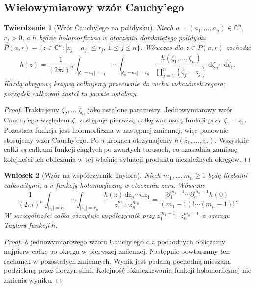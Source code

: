 \documentclass[11pt,a4paper,openany]{report}
\numberwithin{equation}{section}
\theoremstyle{plain}
\newtheorem{twierdzenie}{Twierdzenie}[section]
\newtheorem{wniosek}[twierdzenie]{Wniosek}
\theoremstyle{definition}
\theoremstyle{remark}
\newcommand{\C}{\mathbb C}
\begin{document}
\subsection{Wielowymiarowy wzór Cauchy'ego}
\label{subsec:ga4-cauchy-product}

\begin{twierdzenie}[Wzór Cauchy'ego na polidysku]
\label{tw:ga4-polydisc-cauchy}
Niech $a=(a_1,\ldots,a_n)\in\C^n$, $r_j>0$, a $h$ będzie
holomorficzna w otoczeniu domkniętego polidysku
$\overline P(a,r)=\{z\in\C^n:|z_j-a_j|\le r_j,\ 1\le j\le n\}$.
Wówczas dla $z\in P(a,r)$ zachodzi
\[
 h(z)=\frac{1}{(2\pi i)^n}
 \int_{|\zeta_1-a_1|=r_1}\!\cdots
 \int_{|\zeta_n-a_n|=r_n}
 \frac{h(\zeta_1,\ldots,\zeta_n)}
 {\prod_{j=1}^n(\zeta_j-z_j)}
 \,\mathrm d\zeta_n\cdots\mathrm d\zeta_1.
\]
Każdą okręgową krzywą całkujemy przeciwnie do ruchu wskazówek
zegara; porządek całkowań został tu jawnie ustalony.
\end{twierdzenie}
\begin{proof}
Traktujemy $\zeta_2,\ldots,\zeta_n$ jako ustalone parametry.
Jednowymiarowy wzór Cauchy'ego względem $\zeta_1$ zastępuje
pierwszą całkę wartością funkcji przy $\zeta_1=z_1$.
Pozostała funkcja jest holomorficzna w następnej zmiennej,
więc ponownie stosujemy wzór Cauchy'ego. Po $n$ krokach
otrzymujemy $h(z_1,\ldots,z_n)$.
Wszystkie całki są całkami funkcji ciągłych po zwartych torusach,
co uzasadnia zamianę kolejności ich obliczania w tej właśnie
sytuacji produktu niezależnych okręgów.
\end{proof}

\begin{wniosek}[Wzór na współczynnik Taylora]
\label{wn:ga4-monomial-res}
Niech $m_1,\ldots,m_n\ge1$ będą liczbami całkowitymi,
a $h$ funkcją holomorficzną w otoczeniu zera. Wówczas
\[
\frac{1}{(2\pi i)^n}\int_{|z_1|=r_1}\!\cdots
\int_{|z_n|=r_n}
\frac{h(z)\,\mathrm dz_n\cdots\mathrm dz_1}
{z_1^{m_1}\cdots z_n^{m_n}}
=\frac{\partial_1^{m_1-1}\cdots\partial_n^{m_n-1}h(0)}
{(m_1-1)!\cdots(m_n-1)!}.
\]
W szczególności całka odczytuje współczynnik przy
$z_1^{m_1-1}\cdots z_n^{m_n-1}$ w szeregu Taylora funkcji $h$.
\end{wniosek}
\begin{proof}
Z jednowymiarowego wzoru Cauchy'ego dla pochodnych
obliczamy najpierw całkę po okręgu w pierwszej zmiennej.
Następnie powtarzamy ten rachunek w pozostałych zmiennych.
Wynik jest podaną pochodną mieszaną podzieloną przez
iloczyn silni. Kolejność różniczkowania funkcji
holomorficznej nie zmienia wyniku.
\end{proof}
\end{document}
